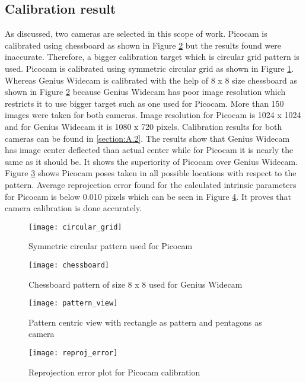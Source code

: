 \subsection{Calibration result}
As discussed, two cameras are selected in this scope of work. Picocam is calibrated using chessboard as shown in Figure \ref{fig:chessboard} but the results found were inaccurate. Therefore, a bigger calibration target which is circular grid pattern is used. Picocam is calibrated using symmetric circular grid as shown in Figure \ref{fig:circular_grid}. Whereas Genius Widecam is calibrated with the help of 8 x 8 size chessboard as shown in Figure \ref{fig:chessboard} because Genius Widecam has poor image resolution which restricts it to use bigger target such as one used for Picocam. More than 150 images were taken for both cameras. Image resolution for Picocam is 1024 x 1024 and for Genius Widecam it is 1080 x 720 pixels. Calibration results for both cameras can be found in \ref{section:A.2}. The results show that Genius Widecam has image center deflected than actual center while for Picocam it is nearly the same as it should be. It shows the superiority of Picocam over Genius Widecam. Figure \ref{fig:pattern_view} shows Picocam poses taken in all possible locations with respect to the pattern. Average reprojection error found for the calculated intrinsic parameters for Picocam is below 0.010 pixels which can be seen in Figure \ref{fig:reproj}. It proves that camera calibration is done accurately.\\
\begin{figure}[H]
	\centering
	\texttt{[image: circular\_grid]}
	\caption{Symmetric circular pattern used for Picocam}
	\label{fig:circular_grid}
\end{figure}%
\begin{figure}[H]
	\centering
	\texttt{[image: chessboard]}
	\caption{Chessboard pattern of size 8 x 8 used for Genius Widecam}
	\label{fig:chessboard}
\end{figure}
\begin{figure}[h!]
	\centering
	\texttt{[image: pattern\_view]}
	\caption{Pattern centric view with rectangle as pattern and pentagons as camera}
	\label{fig:pattern_view}
\end{figure}
\begin{figure}[h!]
	\centering
	\texttt{[image: reproj\_error]}
	\caption{Reprojection error plot for Picocam calibration}
	\label{fig:reproj}
\end{figure}